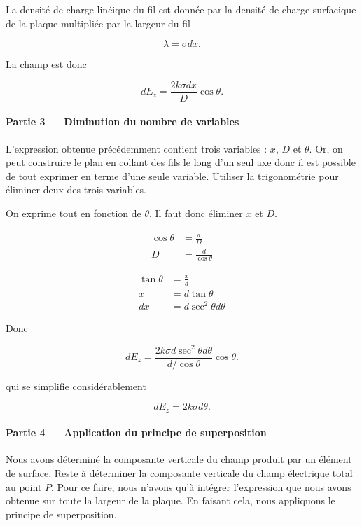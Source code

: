 La densité de charge linéique du fil est donnée par la densité de charge
surfacique de la plaque multipliée par la largeur du fil

$$\lambda = \sigma dx.$$

La champ est donc

$$d E_z = \frac{2k \sigma dx}{D} \cos\theta.$$



\paragraph{Partie 3 --- Diminution du nombre de variables}

L'expression obtenue précédemment contient trois variables : $x$, $D$ et
$\theta$. Or, on peut construire le plan en collant des fils le long d'un seul
axe donc il est possible de tout exprimer en terme d'une seule variable. Utiliser
la trigonométrie pour éliminer deux des trois variables.


On exprime tout en fonction de $\theta$. Il faut donc éliminer $x$ et $D$.

\begin{align*}
  \cos \theta &= \frac{d}{D} \\
           D  &= \frac{d}{\cos\theta}
\end{align*}

\begin{align*}
  \tan \theta &= \frac{x}{d} \\
           x  &= d\tan\theta \\
          dx  &= d\sec^2\theta d\theta
\end{align*}

Donc

  $$d E_z = \frac{2k \sigma d\sec^2\theta d\theta}{d / \cos\theta} \cos\theta.$$

qui se simplifie considérablement

  $$d E_z = 2k \sigma d\theta.$$



\paragraph{Partie 4 --- Application du principe de superposition}

Nous avons déterminé la composante verticale du champ produit par un élément de
surface. Reste à déterminer la composante verticale du champ électrique
total au point $P$. Pour ce faire, nous n'avons qu'à intégrer l'expression que
nous avons obtenue sur toute la largeur de la plaque. En faisant cela, nous
appliquons le principe de superposition.

